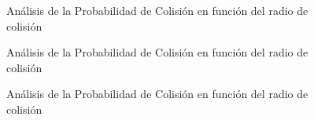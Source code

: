 \begin{figure}[!h]
  \centering
  \caption{An\'alisis de la Probabilidad de Colisi\'on en funci\'on del radio de colisi\'on}
  \label{fig:pocvsraEsc5}
\end{figure}

\begin{figure}[!h]
  \centering
  \caption{An\'alisis de la Probabilidad de Colisi\'on en funci\'on del radio de colisi\'on}
  \label{fig:pocvsraEsc4}
\end{figure}

\begin{figure}[!h]
  \centering
  \caption{An\'alisis de la Probabilidad de Colisi\'on en funci\'on del radio de colisi\'on}
  \label{fig:pocvsraEsc5}
\end{figure}